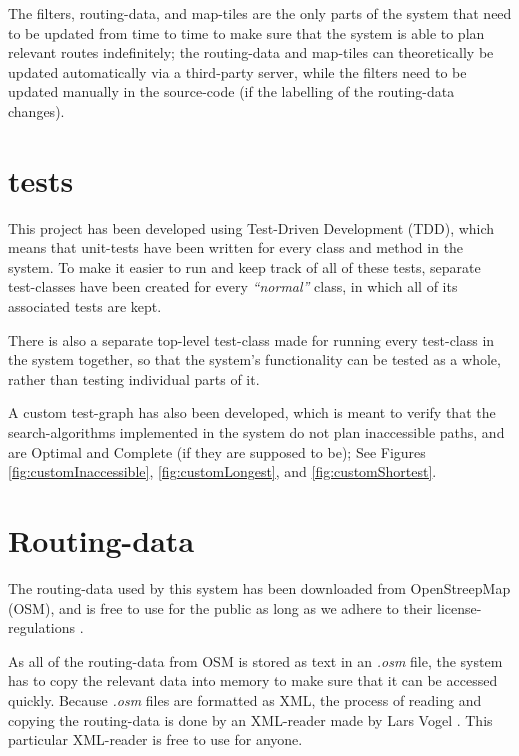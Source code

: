 The filters, routing-data, and map-tiles are the only parts of the system that need to be updated from time to time to make sure that the system is able to plan relevant routes indefinitely; the routing-data and map-tiles can theoretically be updated automatically via a third-party server, while the filters need to be updated manually in the source-code (if the labelling of the routing-data changes\cite{OSM-Features,OSM-Node,OSM-Tags,OSM-Way}).

\newpage
\section{tests}
This project has been developed using Test-Driven Development (TDD), which means that unit-tests have been written for every class and method in the system.
To make it easier to run and keep track of all of these tests, separate test-classes have been created for every \textit{\textquotedblleft normal\textquotedblright} class, in which all of its associated tests are kept.

There is also a separate top-level test-class made for running every test-class in the system together, so that the system's functionality can be tested as a whole, rather than testing individual parts of it.

A custom test-graph has also been developed, which is meant to verify that the search-algorithms implemented in the system do not plan inaccessible paths, and are Optimal and Complete (if they are supposed to be); See Figures \ref{fig:customInaccessible}, \ref{fig:customLongest}, and \ref{fig:customShortest}.

\section{Routing-data}
The routing-data used by this system has been downloaded from OpenStreepMap (OSM)\cite{OSM}, and is free to use for the public as long as we adhere to their license-regulations \cite{OSMLicense}.

As all of the routing-data from OSM is stored as text in an \textit{.osm} file, the system has to copy the relevant data into memory to make sure that it can be accessed quickly. Because \textit{.osm} files are formatted as XML, the process of reading and copying the routing-data is done by an XML-reader made by Lars Vogel \cite{Vogella-XML}. This particular XML-reader is free to use for anyone.

